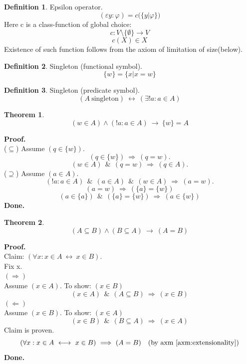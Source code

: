 \documentclass[10pt,a4paper]{article}
\theoremstyle{definition}
\newtheorem{definition}{Definition}[section]
\newtheorem{theorem}{Theorem}[section]
\newcommand{\AND}{\ \ \&\ \ }
\newcommand{\Done}{\noindent \textbf{Done.}\\}
\renewcommand{\iff}{\ \longleftrightarrow\ }
\newcommand{\IMPLIES}{\ \Longrightarrow\ }
\renewcommand{\implies}{\ \longrightarrow\ }
\newcommand{\Proof}{\noindent \textbf{Proof.}\\}
\newcommand{\singleton}{\mathrm{\ singleton}}
\begin{document}
\begin{definition}
\label{def:epsilon operator}
Epsilon operator.
\[
(\varepsilon y: \varphi) = c\big(\{y|\varphi\}\big)
\]
Here c is a class-function of global choice:
\[
c:V\setminus\{\emptyset\}\to V
\]
\[
c(X)\in X
\]
Existence of such function follows from the axiom of limitation of size(below).
\end{definition}


\begin{definition} Singleton (functional symbol).
\[
\{w\} = \{x|x=w\}
\]
\end{definition}

\begin{definition} Singleton (predicate symbol).
\[
(A\singleton) \iff (\exists!a:a\in A)
\]
\end{definition}

\begin{theorem}
\[
(w\in A) \land (!a:a\in A) \implies \{w\}=A
\]
\end{theorem}
\Proof
\noindent($\subseteq$) Assume $(q\in \{w\})$.
\[
(q\in \{w\})\IMPLIES(q=w).
\]
\[
(w\in A)\AND(q=w)\IMPLIES(q\in A).
\]
\noindent($\supseteq$) Assume $(a\in A)$.
\[
(!a:a\in A)\AND(a\in A)\AND(w\in A)\IMPLIES(a=w).
\]
\[
(a=w)\IMPLIES(\{a\}=\{w\})
\]
\[
(a\in\{a\})\AND(\{a\}=\{w\})\IMPLIES(a\in\{w\})
\]
\Done

\begin{theorem}
\[
(A \subseteq B)\land (B\subseteq A) \implies (A=B)
\]
\end{theorem}
\Proof
Claim: $(\forall x:x\in A \iff x\in B)$.\\
Fix x.\\
$(\Rightarrow)$\\
Assume $(x\in A)$. To show: $(x\in B)$\\
\[
(x\in A)
\AND
(A\subseteq B)
\IMPLIES
(x\in B)
\]
$(\Leftarrow)$\\
Assume $(x\in B)$. To show: $(x\in A)$\\
\[
(x\in B)
\AND
(B\subseteq A)
\IMPLIES
(x\in A)
\]
Claim is proven.
\[
(\forall x:x\in A \iff x\in B)
\IMPLIES
(A=B)
\quad\mbox{(by axm \ref{axm:extensionality})}
\]
\Done
\end{document}
